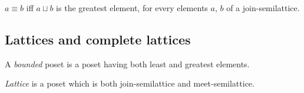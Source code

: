 \begin{obvious}
$a\equiv b$ iff $a\sqcup b$ is the greatest element, for every elements
$a$, $b$ of a join-semilattice.
\end{obvious}

\subsection{Lattices and complete lattices}
\begin{defn}
A \emph{bounded} poset is a poset having both
least and greatest elements.
\end{defn}

\begin{defn}
\emph{Lattice} is a poset which is both join-semilattice
and meet-semilattice.
\end{defn}

